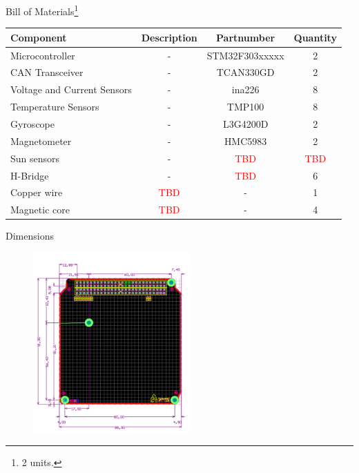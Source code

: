 \documentclass{beamer}
\begin{document}
\begin{frame}{Bill of Materials\footnote{2 units.}}

\begin{table}[!htb]\scriptsize
    \centering
    \label{tab:cost-estimation}
    \begin{tabular}{lccc}
        \toprule[1.5pt]
        \textbf{Component} & \textbf{Description} & \textbf{Partnumber} & \textbf{Quantity} \\
        \midrule
        Microcontroller       &  - & STM32F303xxxxx  & 2 \\
        CAN Transceiver       & - & TCAN330GD  & 2 \\
        Voltage and Current Sensors   & - & ina226 & 8\\
        Temperature Sensors   & - & TMP100 & 8\\
        Gyroscope             & - & L3G4200D & 2\\
        Magnetometer          & - & HMC5983 & 2\\
        Sun sensors           & - & \textcolor{red}{TBD} & \textcolor{red}{TBD}\\
        H-Bridge              & - & \textcolor{red}{TBD} & 6 \\
        Copper wire           & \textcolor{red}{TBD} & - & 1 \\
        Magnetic core         & \textcolor{red}{TBD} & - & 4 \\
        
        \bottomrule[1.5pt]
    \end{tabular}
\end{table}

\end{frame}

\begin{frame}{Dimensions}
    
    \begin{figure}[!ht]
        \begin{center}
            \includegraphics[width=6cm]{figures/board-dimensions-adcs.png}
        \end{center}
    \end{figure}

\end{frame}
\end{document}
